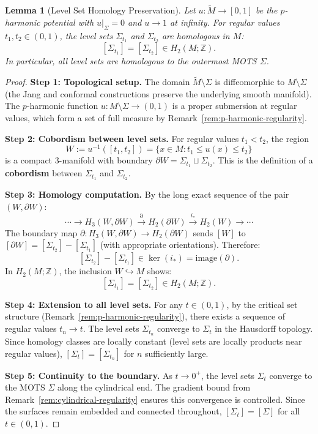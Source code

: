 \documentclass[12pt]{article}
\theoremstyle{plain}
\newtheorem{lemma}[theorem]{Lemma}
\theoremstyle{definition}
\theoremstyle{remark}
\newcommand{\tM}{\tilde{M}}
\begin{document}
\begin{lemma}[Level Set Homology Preservation]\label{lem:homology}
Let $u: \tM \to [0, 1]$ be the $p$-harmonic potential with $u|_\Sigma = 0$ and $u \to 1$ at infinity. For regular values $t_1, t_2 \in (0, 1)$, the level sets $\Sigma_{t_1}$ and $\Sigma_{t_2}$ are homologous in $M$:
\[
[\Sigma_{t_1}] = [\Sigma_{t_2}] \in H_2(M; \mathbb{Z}).
\]
In particular, all level sets are homologous to the outermost MOTS $\Sigma$.
\end{lemma}

\begin{proof}
\textbf{Step 1: Topological setup.}
The domain $\tM \setminus \Sigma$ is diffeomorphic to $M \setminus \Sigma$ (the Jang and conformal constructions preserve the underlying smooth manifold). The $p$-harmonic function $u: M \setminus \Sigma \to (0, 1)$ is a proper submersion at regular values, which form a set of full measure by Remark~\ref{rem:p-harmonic-regularity}.

\textbf{Step 2: Cobordism between level sets.}
For regular values $t_1 < t_2$, the region
\[
W := u^{-1}([t_1, t_2]) = \{x \in M : t_1 \leq u(x) \leq t_2\}
\]
is a compact 3-manifold with boundary $\partial W = \Sigma_{t_1} \sqcup \Sigma_{t_2}$. This is the definition of a \textbf{cobordism} between $\Sigma_{t_1}$ and $\Sigma_{t_2}$.

\textbf{Step 3: Homology computation.}
By the long exact sequence of the pair $(W, \partial W)$:
\[
\cdots \to H_3(W, \partial W) \xrightarrow{\partial} H_2(\partial W) \xrightarrow{i_*} H_2(W) \to \cdots
\]
The boundary map $\partial: H_3(W, \partial W) \to H_2(\partial W)$ sends $[W]$ to $[\partial W] = [\Sigma_{t_2}] - [\Sigma_{t_1}]$ (with appropriate orientations). Therefore:
\[
[\Sigma_{t_2}] - [\Sigma_{t_1}] \in \ker(i_*) = \text{image}(\partial).
\]
In $H_2(M; \mathbb{Z})$, the inclusion $W \hookrightarrow M$ shows:
\[
[\Sigma_{t_1}] = [\Sigma_{t_2}] \in H_2(M; \mathbb{Z}).
\]

\textbf{Step 4: Extension to all level sets.}
For any $t \in (0, 1)$, by the critical set structure (Remark~\ref{rem:p-harmonic-regularity}), there exists a sequence of regular values $t_n \to t$. The level sets $\Sigma_{t_n}$ converge to $\Sigma_t$ in the Hausdorff topology. Since homology classes are locally constant (level sets are locally products near regular values), $[\Sigma_t] = [\Sigma_{t_n}]$ for $n$ sufficiently large.

\textbf{Step 5: Continuity to the boundary.}
As $t \to 0^+$, the level sets $\Sigma_t$ converge to the MOTS $\Sigma$ along the cylindrical end. The gradient bound from Remark~\ref{rem:cylindrical-regularity} ensures this convergence is controlled. Since the surfaces remain embedded and connected throughout, $[\Sigma_t] = [\Sigma]$ for all $t \in (0, 1)$.


\end{proof}
\end{document}
